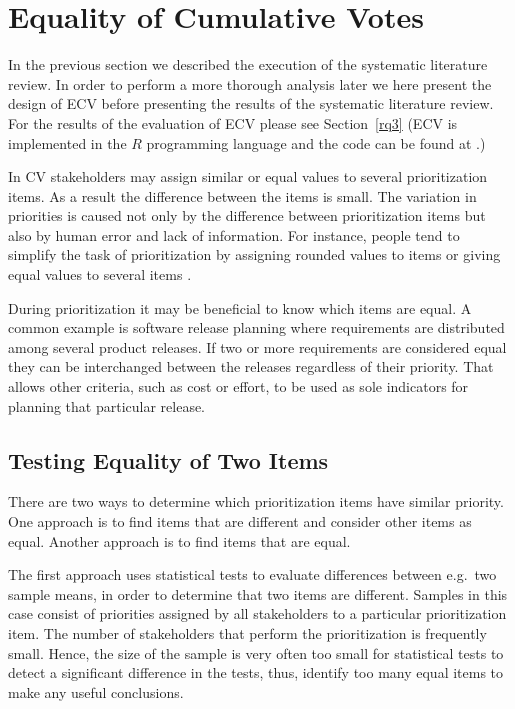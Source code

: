 \section{Equality of Cumulative Votes \label{ecv}}
In the previous section we described the execution of the systematic literature review. In order to perform a more thorough analysis later we here present the design of ECV before presenting the results of the systematic literature review. For the results of the evaluation of ECV please see Section~\ref{rq3} (ECV is implemented in the $R$ programming language \cite{Ihaka1996} and the code can be found at \cite{Rinkevics2011}.)

In CV stakeholders may assign similar or equal values to several prioritization items. As a result the difference between the items is small. The variation in priorities is caused not only by the difference between prioritization items but also by human error and lack of information. For instance, people tend to simplify the task of prioritization by assigning rounded values to items or giving equal values to several items \cite{Groves2009}.

During prioritization it may be beneficial to know which items are equal. A common example is software release planning where requirements are distributed among several product releases.
If two or more requirements are considered equal they can be interchanged between the releases regardless of their priority.
That allows other criteria, such as cost or effort, to be used as sole indicators for planning that particular release.

\subsection{\label{Testing-Equality-of}Testing Equality of Two Items}
There are two ways to determine which prioritization items have similar priority.
One approach is to find items that are different and consider other items as equal.
Another approach is to find items that are equal.

The first approach uses statistical tests to evaluate differences between e.g.\ two sample means, in order to determine that two items are different.
Samples in this case consist of priorities assigned by all stakeholders to a particular prioritization item.
The number of stakeholders that perform the prioritization is frequently small.
Hence, the size of the sample is very often too small for statistical tests to detect a significant difference in the tests, thus, identify too many equal items to make any useful conclusions.


